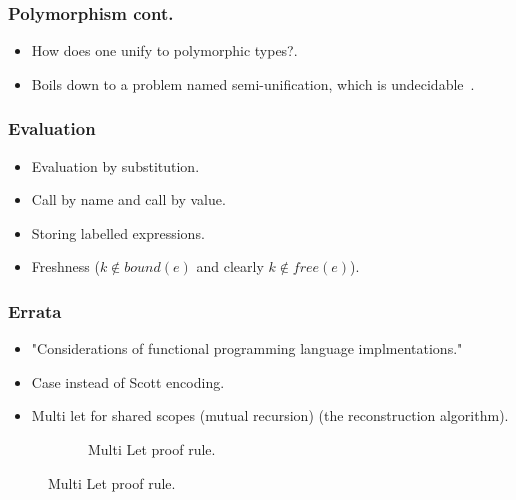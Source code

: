 \documentclass{beamer}
\begin{document}
\begin{frame}
\frametitle{Polymorphism cont.}
    \begin{itemize}
        \item How does one unify to polymorphic types?.
        \item Boils down to a problem named semi-unification, which is undecidable~\cite{WELLS1999111,NAMEHERE}.
    \end{itemize}
\end{frame}

\begin{frame}
\frametitle{Evaluation}
    \begin{itemize}
        \item Evaluation by substitution.
        \item Call by name and call by value.
        \item Storing labelled expressions.
        \item Freshness ($k \notin \textit{bound}(e)$ and clearly $k \notin \textit{free}(e)$).
    \end{itemize}
\end{frame}


\begin{frame}
\frametitle{Errata}
    \begin{itemize}
        \item "Considerations of functional programming language implmentations."
        \item Case instead of Scott encoding.
        \item Multi let for shared scopes (mutual recursion) (the reconstruction algorithm).
    \end{itemize}
    \begin{figure}
    \hspace*{-1.5cm}
    \begin{subfigure}[b]{1\textwidth}
    \begin{prooftree}
    \end{prooftree}
    \caption{Multi Let proof rule.}
    \end{subfigure}
    \end{figure}
\end{frame}
\end{document}
